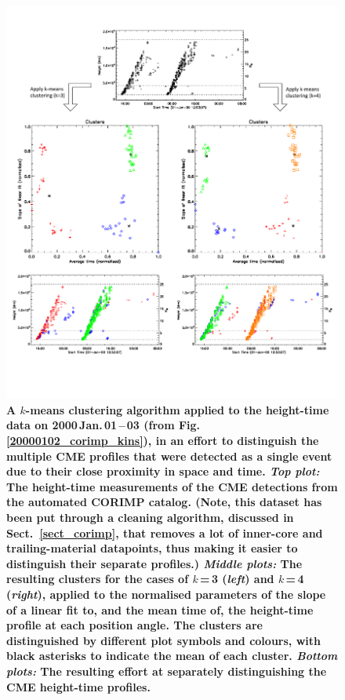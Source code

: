 \documentclass[referee,a4paper,12pt,traditabstract]{swsc}
\begin{document}
\begin{linenumbers}
\begin{figure}[ht]
\centerline{\includegraphics[scale=0.578, trim=0 95 0 50, clip=true]{images/20000101_cluster_kins_input.pdf}}
\caption{{\bf A $k$-means clustering algorithm applied to the height-time data on 2000\,Jan.\,01\,--\,03 (from Fig.\,\ref{20000102_corimp_kins}), in an effort to distinguish the multiple CME profiles that were detected as a single event due to their close proximity in space and time. \emph{Top plot:} The height-time measurements of the CME detections from the automated CORIMP catalog. (Note, this dataset has been put through a cleaning algorithm, discussed in Sect.~\ref{sect_corimp}, that removes a lot of inner-core and trailing-material datapoints, thus making it easier to distinguish their separate profiles.) \emph{Middle plots:} The resulting clusters for the cases of $k$\,=\,3 (\emph{left}) and $k$\,=\,4 (\emph{right}), applied to the normalised parameters of the slope of a linear fit to, and the mean time of, the height-time profile at each position angle. The clusters are distinguished by different plot symbols and colours, with black asterisks to indicate the mean of each cluster. \emph{Bottom plots:} The resulting effort at separately distinguishing the CME height-time profiles.} 
}
\label{20000101_cluster_kins}
\end{figure}


\end{linenumbers}
\end{document}
